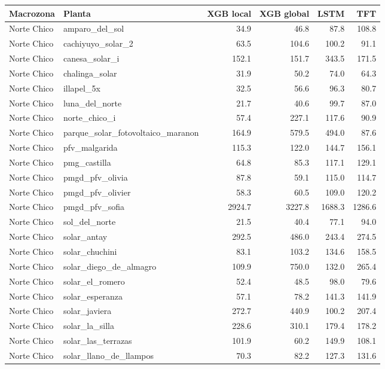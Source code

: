 {\small
\begin{longtable}{llrrrr}
\toprule
Macrozona & Planta & XGB local & XGB global & LSTM & TFT \\
\midrule
\endhead
Norte Chico & amparo\_del\_sol & 34.9 & 46.8 & 87.8 & 108.8 \\
Norte Chico & cachiyuyo\_solar\_2 & 63.5 & 104.6 & 100.2 & 91.1 \\
Norte Chico & canesa\_solar\_i & 152.1 & 151.7 & 343.5 & 171.5 \\
Norte Chico & chalinga\_solar & 31.9 & 50.2 & 74.0 & 64.3 \\
Norte Chico & illapel\_5x & 32.5 & 56.6 & 96.3 & 80.7 \\
Norte Chico & luna\_del\_norte & 21.7 & 40.6 & 99.7 & 87.0 \\
Norte Chico & norte\_chico\_i & 57.4 & 227.1 & 117.6 & 90.9 \\
Norte Chico & parque\_solar\_fotovoltaico\_maranon & 164.9 & 579.5 & 494.0 & 87.6 \\
Norte Chico & pfv\_malgarida & 115.3 & 122.0 & 144.7 & 156.1 \\
Norte Chico & pmg\_castilla & 64.8 & 85.3 & 117.1 & 129.1 \\
Norte Chico & pmgd\_pfv\_olivia & 87.8 & 59.1 & 115.0 & 114.7 \\
Norte Chico & pmgd\_pfv\_olivier & 58.3 & 60.5 & 109.0 & 120.2 \\
Norte Chico & pmgd\_pfv\_sofia & 2924.7 & 3227.8 & 1688.3 & 1286.6 \\
Norte Chico & sol\_del\_norte & 21.5 & 40.4 & 77.1 & 94.0 \\
Norte Chico & solar\_antay & 292.5 & 486.0 & 243.4 & 274.5 \\
Norte Chico & solar\_chuchini & 83.1 & 103.2 & 134.6 & 158.5 \\
Norte Chico & solar\_diego\_de\_almagro & 109.9 & 750.0 & 132.0 & 265.4 \\
Norte Chico & solar\_el\_romero & 52.4 & 48.5 & 98.0 & 79.6 \\
Norte Chico & solar\_esperanza & 57.1 & 78.2 & 141.3 & 141.9 \\
Norte Chico & solar\_javiera & 272.7 & 440.9 & 100.2 & 207.4 \\
Norte Chico & solar\_la\_silla & 228.6 & 310.1 & 179.4 & 178.2 \\
Norte Chico & solar\_las\_terrazas & 101.9 & 60.2 & 149.9 & 108.1 \\
Norte Chico & solar\_llano\_de\_llampos & 70.3 & 82.2 & 127.3 & 131.6 \\

\end{longtable}}
